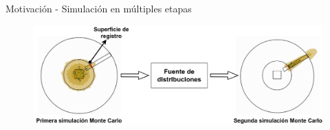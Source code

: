 \documentclass[aspectratio=169,english]{beamer}
\begin{document}
\begin{frame}{Motivación - Simulación en múltiples etapas}
    \begin{figure}
        \centering
        \includegraphics[width=1\linewidth]{imagens/nucleo4.png}
    \end{figure}
\end{frame}




\end{document}
